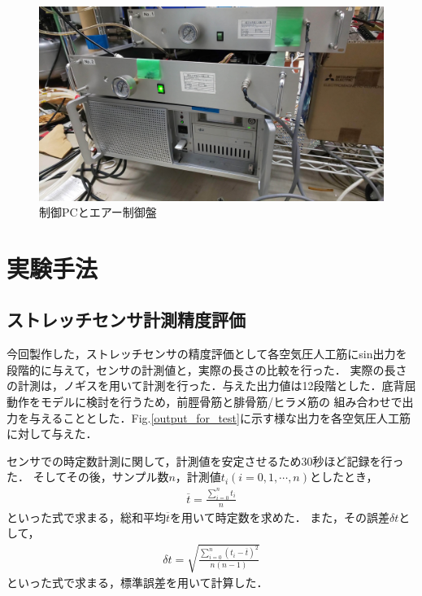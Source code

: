 \begin{figure}[h]
    \begin{center}
     \includegraphics[width=0.65\columnwidth,clip]{./3_analysis/PC.eps}
     \caption{制御PCとエアー制御盤}
     \label{fig:PC}
    \end{center}
\end{figure}

\newpage

\section{実験手法}
\subsection{ストレッチセンサ計測精度評価}
今回製作した，ストレッチセンサの精度評価として各空気圧人工筋にsin出力を段階的に与えて，センサの計測値と，実際の長さの比較を行った．
実際の長さの計測は，ノギスを用いて計測を行った．与えた出力値は12段階とした．底背屈動作をモデルに検討を行うため，前脛骨筋と腓骨筋/ヒラメ筋の
組み合わせで出力を与えることとした．Fig.\ref{output_for_test}に示す様な出力を各空気圧人工筋に対して与えた．

センサでの時定数計測に関して，計測値を安定させるため30秒ほど記録を行った．
そしてその後，サンプル数$n$，計測値$t_i \left(i=0,1,\cdots,n\right)$としたとき，
\begin{eqnarray}
        \overline{t}=\frac{\sum_{i=0}^n t_i}{n}
\end{eqnarray}
といった式で求まる，総和平均$\overline{t}$を用いて時定数を求めた．
また，その誤差$\delta t$として，
\begin{eqnarray}
    \delta t = \sqrt{ \frac{\sum_{i=0}^n \left(t_i-\overline{t}\right)^2}{n(n-1)}}
\end{eqnarray}
といった式で求まる，標準誤差を用いて計算した．


